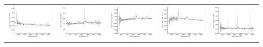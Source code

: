 \begin{center}
\begin{longtable}{l l l l l }
    \includegraphics[width=0.2\linewidth, clip]{Figs/Figs-sdss/spec-7864-56979-0753-STRIPE82-0008-034263.pdf} & \includegraphics[width=0.2\linewidth, clip]{Figs/Figs-sdss/spec-7866-57002-0979-STRIPE82-0014-010956.pdf} & \includegraphics[width=0.2\linewidth, clip]{Figs/Figs-sdss/spec-7868-57006-0207-STRIPE82-0015-016996.pdf} & \includegraphics[width=0.2\linewidth, clip]{Figs/Figs-sdss/spec-7868-57006-0691-STRIPE82-0014-014477.pdf} & \includegraphics[width=0.2\linewidth, clip]{Figs/Figs-sdss/spec-7870-57016-0292-STRIPE82-0017-021131.pdf} \\

\end{longtable}
\end{center}
